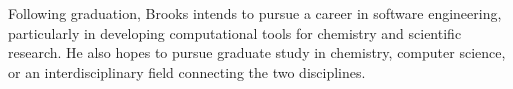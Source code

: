 \documentclass[palatino,code,picins,tikz,kaukecopyright,openright,lshortwooster,dropcaps,verbatim,index,oneside,euler,final]{woosterthesis}
\begin{document}
\begin{vita}
Following graduation, Brooks intends to pursue a career in
software engineering, particularly in developing computational
tools for chemistry and scientific research. He also hopes
to pursue graduate study in chemistry, computer science,
or an interdisciplinary field connecting the two disciplines.

\begin{fieldsstudy}
\end{fieldsstudy}

\end{vita}


%
%


\cleardoublepage
{}
{}

\tableofcontents
\listoffigures %
\listoftables%
\lstlistoflistings%



\mainmatter

%
%
%





%
%
%
%

\end{document}
